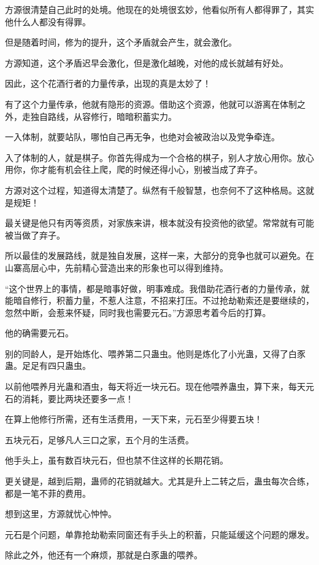 \begin{this_body}
方源很清楚自己此时的处境。他现在的处境很玄妙，他看似所有人都得罪了，其实他什么人都没有得罪。

但是随着时间，修为的提升，这个矛盾就会产生，就会激化。

方源知道，这个矛盾迟早会激化，但是激化越晚，对他的成长就越有好处。

因此，这个花酒行者的力量传承，出现的真是太妙了！

有了这个力量传承，他就有隐形的资源。借助这个资源，他就可以游离在体制之外，走独自路线，从容修行，暗暗积蓄实力。

一入体制，就要站队，哪怕自己再无争，也绝对会被政治以及党争牵连。

入了体制的人，就是棋子。你首先得成为一个合格的棋子，别人才放心用你。放心用你，你才能有机会往上爬，爬的时候还得小心，别被当成了弃子。

方源对这个过程，知道得太清楚了。纵然有千般智慧，也奈何不了这种格局。这就是规矩！

最关键是他只有丙等资质，对家族来讲，根本就没有投资他的欲望。常常就有可能被当做了弃子。

所以最佳的发展路线，就是独自发展，这样一来，大部分的竞争也就可以避免。在山寨高层心中，先前精心营造出来的形象也可以得到维持。

“这个世界上的事情，都是暗事好做，明事难成。我借助花酒行者的力量传承，就能暗自修行，积蓄力量，不惹人注意，不招来打压。不过抢劫勒索还是要继续的，忽然中断，会惹来怀疑，同时我也需要元石。”方源思考着今后的打算。

他的确需要元石。

别的同龄人，是开始炼化、喂养第二只蛊虫。他则是炼化了小光蛊，又得了白豕蛊。足足有四只蛊虫。

以前他喂养月光蛊和酒虫，每天将近一块元石。现在他喂养蛊虫，算下来，每天元石的消耗，要比两块还要多一点！

在算上他修行所需，还有生活费用，一天下来，元石至少得要五块！

五块元石，足够凡人三口之家，五个月的生活费。

他手头上，虽有数百块元石，但也禁不住这样的长期花销。

更关键是，越到后期，蛊师的花销就越大。尤其是升上二转之后，蛊虫每次合练，都是一笔不菲的费用。

想到这里，方源就忧心忡忡。

元石是个问题，单靠抢劫勒索同窗还有手头上的积蓄，只能延缓这个问题的爆发。

除此之外，他还有一个麻烦，那就是白豕蛊的喂养。


\end{this_body}
